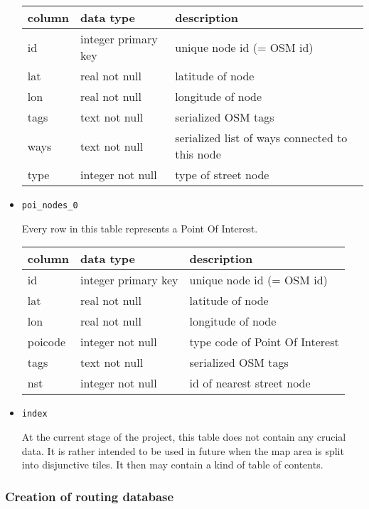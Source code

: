 \begin{itemize}
		\begin{tabular}[ht]{|p{2.5cm}|p{3.5cm}|p{8.5cm}|}
			\hline
			column & data type & description \\
			\hline\hline
			 id & integer primary key & unique node id (= OSM id)\\	
			 lat & real not null & latitude of node\\			 
			 lon & real not null & longitude of node\\	
			 tags & text not null & serialized OSM tags\\			 
			 ways & text not null & serialized list of ways connected to this node\\	
			 type & integer not null & type of street node\\				 
			\hline
		\end{tabular}\newline
	
	\item \texttt{poi\_nodes\_0}

		Every row in this table represents a Point Of Interest.\newline
		
		\begin{tabular}[ht]{|p{2.5cm}|p{3.5cm}|p{8.5cm}|}
			\hline
			column & data type & description \\
			\hline\hline
			 id & integer primary key & unique node id (= OSM id)\\	
			 lat & real not null & latitude of node\\			 
			 lon & real not null & longitude of node\\
			 poicode & integer not null & type code of Point Of Interest\\	
			 tags & text not null & serialized OSM tags\\			 
			 nst & integer not null & id of nearest street node\\			 
			\hline
		\end{tabular}\newline
	
	\item \texttt{index}
	
		At the current stage of the project, this table does not contain any crucial data. It is rather intended to be used in future when the map area is split into disjunctive tiles. It then may contain a kind of table of contents.
		
\end{itemize}


\subsubsection{Creation of routing database}